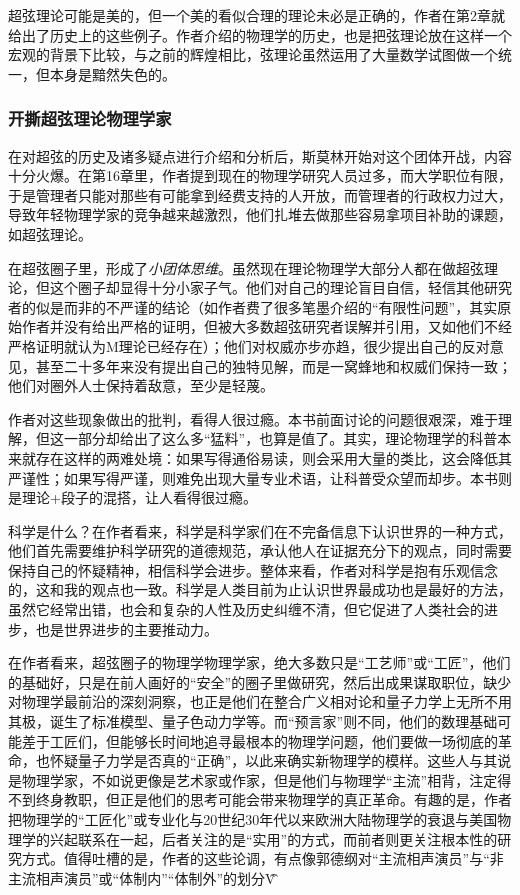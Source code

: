超弦理论可能是美的，但一个美的看似合理的理论未必是正确的，作者在第2章就给出了历史上的这些例子。作者介绍的物理学的历史，也是把弦理论放在这样一个宏观的背景下比较，与之前的辉煌相比，弦理论虽然运用了大量数学试图做一个统一，但本身是黯然失色的。

\subsubsection{开撕超弦理论物理学家}
在对超弦的历史及诸多疑点进行介绍和分析后，斯莫林开始对这个团体开战，内容十分火爆。在第16章里，作者提到现在的物理学研究人员过多，而大学职位有限，于是管理者只能对那些有可能拿到经费支持的人开放，而管理者的行政权力过大，导致年轻物理学家的竞争越来越激烈，他们扎堆去做那些容易拿项目补助的课题，如超弦理论。

在超弦圈子里，形成了\emph{小团体思维}。虽然现在理论物理学大部分人都在做超弦理论，但这个圈子却显得十分小家子气。他们对自己的理论盲目自信，轻信其他研究者的似是而非的不严谨的结论（如作者费了很多笔墨介绍的“有限性问题”，其实原始作者并没有给出严格的证明，但被大多数超弦研究者误解并引用，又如他们不经严格证明就认为M理论已经存在）；他们对权威亦步亦趋，很少提出自己的反对意见，甚至二十多年来没有提出自己的独特见解，而是一窝蜂地和权威们保持一致；他们对圈外人士保持着敌意，至少是轻蔑。

作者对这些现象做出的批判，看得人很过瘾。本书前面讨论的问题很艰深，难于理解，但这一部分却给出了这么多“猛料”，也算是值了。其实，理论物理学的科普本来就存在这样的两难处境：如果写得通俗易读，则会采用大量的类比，这会降低其严谨性；如果写得严谨，则难免出现大量专业术语，让科普受众望而却步。本书则是理论+段子的混搭，让人看得很过瘾。

科学是什么？在作者看来，科学是科学家们在不完备信息下认识世界的一种方式，他们首先需要维护科学研究的道德规范，承认他人在证据充分下的观点，同时需要保持自己的怀疑精神，相信科学会进步。整体来看，作者对科学是抱有乐观信念的，这和我的观点也一致。科学是人类目前为止认识世界最成功也是最好的方法，虽然它经常出错，也会和复杂的人性及历史纠缠不清，但它促进了人类社会的进步，也是世界进步的主要推动力。

在作者看来，超弦圈子的物理学物理学家，绝大多数只是“工艺师”或“工匠”，他们的基础好，只是在前人画好的“安全”的圈子里做研究，然后出成果谋取职位，缺少对物理学最前沿的深刻洞察，也正是他们在整合广义相对论和量子力学上无所不用其极，诞生了标准模型、量子色动力学等。而“预言家”则不同，他们的数理基础可能差于工匠们，但能够长时间地追寻最根本的物理学问题，他们要做一场彻底的革命，也怀疑量子力学是否真的“正确”，以此来确实新物理学的模样。这些人与其说是物理学家，不如说更像是艺术家或作家，但是他们与物理学“主流”相背，注定得不到终身教职，但正是他们的思考可能会带来物理学的真正革命。有趣的是，作者把物理学的“工匠化”或专业化与20世纪30年代以来欧洲大陆物理学的衰退与美国物理学的兴起联系在一起，后者关注的是“实用”的方式，而前者则更关注根本性的研究方式。值得吐槽的是，作者的这些论调，有点像郭德纲对“主流相声演员”与“非主流相声演员”或“体制内”“体制外”的划分\^V\^。

